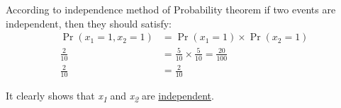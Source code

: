 \documentclass{article}
\DeclareMathOperator{\CondProb}{Pr}
\newcommand{\writex}[2]{{\it{#1\textsubscript#2}}}
\begin{document}
According to independence method of Probability theorem if two events are independent, then they should satisfy:
\begin{equation*}
	\begin{aligned}
	\CondProb{(x_1 = 1, x_2 = 1)} &= \CondProb{(x_1 = 1)}\times\CondProb{(x_2 = 1)} \\
	\frac{2}{10} &= \frac{5}{10}\times\frac{5}{10} = \frac{20}{100} \\
	\frac{2}{10} &= \frac{2}{10}
	\end{aligned}
\end{equation*}

It clearly shows that \writex{x}{1} and  \writex{x}{2} are \underline{independent}. 
\end{document}
